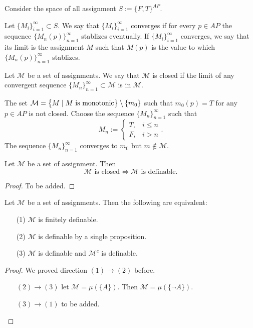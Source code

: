 \documentclass[11pt,a4paper]{article}
\begin{document}
  Consider the space of all assignment $S := \{F, T\}^{AP}$.
  \begin{definition}
    Let $\{M_i\}_{i=1}^{\infty} \subset S$.
    We say that $\{M_i\}_{i=1}^{\infty}$ converges if for every $p \in AP$
    the sequence $\{M_n(p)\}_{n=1}^{\infty}$ stablizes eventually.
    If $\{M_i\}_{i=1}^{\infty}$ converges, we say that its limit is
    the assignment $M$ such that $M(p)$ is the value to which
    $\{M_n(p)\}_{n=1}^{\infty}$ stablizes.
  \end{definition}
  
  \begin{definition}
    Let $\mathcal M$ be a set of assignments.
    We say that $\mathcal M$ is closed if the limit of any convergent sequence
    $\{M_n\}_{n=1}^{\infty} \subset \mathcal M$ is in $\mathcal M$.
  \end{definition}
  
  \begin{example}
    The set $\mathcal M = \set{M \mid M \text{ is monotonic}} \setminus \{m_0\}$
    such that $m_0(p) = T$ for any $p \in AP$ is not closed.
    Choose the sequence $\{M_n\}_{n=1}^{\infty}$ such that
    \[
      M_n :=
      \begin{cases}
        T, &i \le n \\
        F, &i > n
      \end{cases}.
    \]
    The sequence $\{M_n\}_{n=1}^{\infty}$ converges to $m_0$ but 
    $m \notin \mathcal M$.
  \end{example}

  \begin{proposition}
    Let $\mathcal M$ be a set of assignment. Then
    \[
      \mathcal M \text{ is closed} \iff
      \mathcal M \text{ is definable}.
    \]
  \end{proposition}
  \begin{proof}
    To be added.
  \end{proof}

  \begin{proposition}
    Let $\mathcal M$ be a set of assignments. Then the following are equivalent:
    \begin{enumerate}
      \item[(1)] $\mathcal M$ is finitely definable.
      \item[(2)] $\mathcal M$ is definable by a single proposition.
      \item[(3)] $\mathcal M$ is definable and $\mathcal M^c$ is definable.
    \end{enumerate}
  \end{proposition}
  \begin{proof}
    We proved direction $(1) \to (2)$ before.
    \begin{enumerate}
      \item[$(2) \to (3)$] let $\mathcal M = \mu(\{A\})$.
        Then $\mathcal M = \mu(\{\neg A\})$.
      \item[$(3) \to (1)$] to be added.
    \end{enumerate}
  \end{proof}
\end{document}
